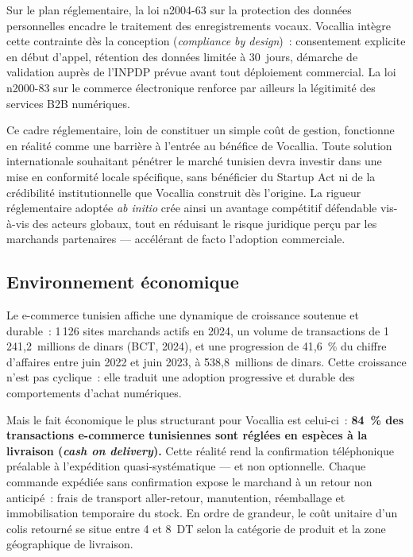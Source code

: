 Sur le plan réglementaire, la loi n\degre{}2004-63 sur la protection des données personnelles encadre le traitement des enregistrements vocaux. Vocallia intègre cette contrainte dès la conception (\emph{compliance by design})~: consentement explicite en début d'appel, rétention des données limitée à 30~jours, démarche de validation auprès de l'INPDP prévue avant tout déploiement commercial. La loi n\degre{}2000-83 sur le commerce électronique renforce par ailleurs la légitimité des services B2B numériques.

Ce cadre réglementaire, loin de constituer un simple coût de gestion, fonctionne en réalité comme une barrière à l'entrée au bénéfice de Vocallia. Toute solution internationale souhaitant pénétrer le marché tunisien devra investir dans une mise en conformité locale spécifique, sans bénéficier du Startup Act ni de la crédibilité institutionnelle que Vocallia construit dès l'origine. La rigueur réglementaire adoptée \emph{ab initio} crée ainsi un avantage compétitif défendable vis-à-vis des acteurs globaux, tout en réduisant le risque juridique perçu par les marchands partenaires --- accélérant de facto l'adoption commerciale.

\subsection{Environnement économique}
\label{section2.1.2}

Le e-commerce tunisien affiche une dynamique de croissance soutenue et durable~: 1\,126 sites marchands actifs en 2024, un volume de transactions de 1\,241,2~millions de dinars (BCT, 2024), et une progression de 41,6~\% du chiffre d'affaires entre juin 2022 et juin 2023, à 538,8~millions de dinars. Cette croissance n'est pas cyclique~: elle traduit une adoption progressive et durable des comportements d'achat numériques.

Mais le fait économique le plus structurant pour Vocallia est celui-ci~: \textbf{84~\% des transactions e-commerce tunisiennes sont réglées en espèces à la livraison (\emph{cash on delivery}).} Cette réalité rend la confirmation téléphonique préalable à l'expédition quasi-systématique --- et non optionnelle. Chaque commande expédiée sans confirmation expose le marchand à un retour non anticipé~: frais de transport aller-retour, manutention, réemballage et immobilisation temporaire du stock. En ordre de grandeur, le coût unitaire d'un colis retourné se situe entre 4 et 8~DT selon la catégorie de produit et la zone géographique de livraison.

